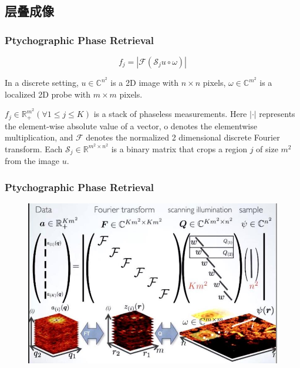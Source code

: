 \documentclass[UTF8]{beamer}
\begin{document}
\subsection{层叠成像}






\begin{frame}[c]\frametitle{Ptychographic Phase Retrieval}
\begin{equation}
\label{basic}
f_{j}=\left|\mathcal{F}\left( \mathcal{S}_{j} u  \circ \omega \right)\right|
\end{equation}

In a discrete setting, $u \in \mathbb{C}^{n^2}$ is a 2D image with $n \times n$ pixels, $\omega \in \mathbb{C}^{m^2}$ is a localized 2D probe with $m \times m$ pixels.

$f_{j} \in \mathbb{R}_{+}^{m^2}(\forall 1 \leq j \leq K)$ is a stack of phaseless measurements. Here $|\cdot|$ represents the element-wise absolute value of a vector, o denotes the elementwise multiplication, and $\mathcal{F}$ denotes the normalized 2 dimensional discrete Fourier transform. Each $\mathcal{S}_{j} \in \mathbb{R}^{m^2 \times n^2}$ is a binary matrix that crops a region $j$ of size $m^2$ from the image $u$.


\end{frame}


\begin{frame}[c]\frametitle{Ptychographic Phase Retrieval}
\begin{figure}[H]
	\centering
	
	\includegraphics[width=1\linewidth]{../figures0/ptycho.jpg}  
	
\end{figure}

\end{frame}
\end{document}
